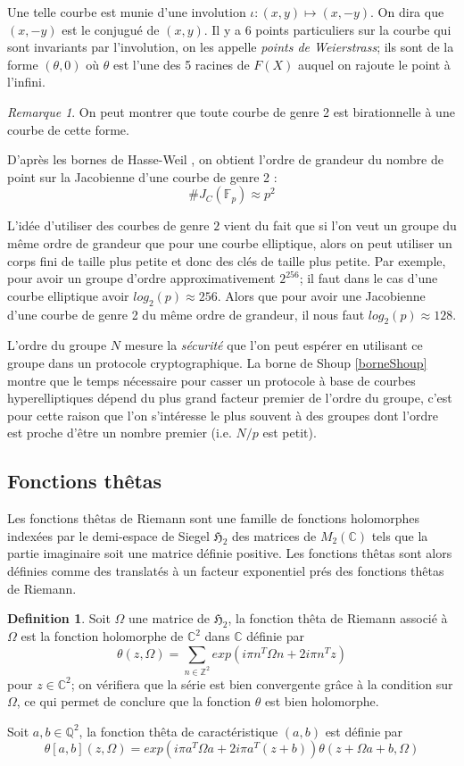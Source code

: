 \documentclass[a4paper]{article}
\theoremstyle{definition}
\newtheorem{definition}{Definition}[section]
\theoremstyle{remark}
\newtheorem{remarque}{Remarque}
\numberwithin{equation}{section}
\begin{document}
Une telle courbe est munie d'une involution $\iota : (x,y) \longmapsto (x,-y)$. On dira que $(x,-y)$ est le conjugué de $(x,y)$. Il y a 6 points particuliers sur la courbe qui sont invariants par l'involution, on les appelle \emph{points de Weierstrass}; ils sont de la forme $(\theta,0)$ où $\theta$ est l'une des 5 racines de $F(X)$ auquel on rajoute le point à l'infini.

\begin{remarque}
On peut montrer que toute courbe de genre 2 est birationnelle à une courbe de cette forme.
\end{remarque}

D'après les bornes de Hasse-Weil \cite{weil}, on obtient l'ordre de grandeur du nombre de point sur la Jacobienne d'une courbe de genre 2 :
$$\#J_C(\mathbb{F}_p) \approx p^2$$

L'idée d'utiliser des courbes de genre $2$ vient du fait que si l'on veut un groupe du même ordre de grandeur que pour une courbe elliptique, alors on peut utiliser un corps fini de taille plus petite et donc des clés de taille plus petite. Par exemple, pour avoir un groupe d'ordre approximativement $2^{256}$; il faut dans le cas d'une courbe elliptique avoir $log_2(p) \approx 256$. Alors que pour avoir une Jacobienne d'une courbe de genre 2 du même ordre de grandeur, il nous faut $log_2(p) \approx 128$.

L'ordre du groupe $N$ mesure la \emph{sécurité} que l'on peut espérer en utilisant ce groupe dans un protocole cryptographique. La borne de Shoup \ref{borneShoup} montre que le temps nécessaire pour casser un protocole à base de courbes hyperelliptiques dépend du plus grand facteur premier de l'ordre du groupe, c'est pour cette raison que l'on s'intéresse le plus souvent à des groupes dont l'ordre est proche d'être un nombre premier (i.e. $N/p$ est petit).

\subsection{Fonctions thêtas}
Les fonctions thêtas de Riemann sont une famille de fonctions holomorphes indexées par le demi-espace de Siegel $\mathfrak{H}_2$ des matrices de $M_2(\mathbb{C})$ tels que la partie imaginaire soit une matrice définie positive. Les fonctions thêtas sont alors définies comme des translatés à un facteur exponentiel prés des fonctions thêtas de Riemann.

\begin{definition}
Soit $\Omega$ une matrice de $\mathfrak{H}_2$, la fonction thêta de Riemann associé à $\Omega$ est la fonction holomorphe de $\mathbb{C}^2$ dans $\mathbb{C}$ définie par
$$\theta(z,\Omega) = \sum_{n \in \mathbb{Z}^2}{exp(i\pi n^T \Omega n + 2i\pi n^T z)}$$
pour $z \in \mathbb{C}^2$; on vérifiera que la série est bien convergente grâce à la condition sur $\Omega$, ce qui permet de conclure que la fonction $\theta$ est bien holomorphe.

Soit $a,b \in \mathbb{Q}^2$, la fonction thêta de caractéristique $(a,b)$ est définie par
$$\theta[a,b](z,\Omega) = exp(i\pi a^T\Omega a + 2i\pi a^T(z+b))\theta(z + \Omega a + b, \Omega)$$
\end{definition}
\end{document}
